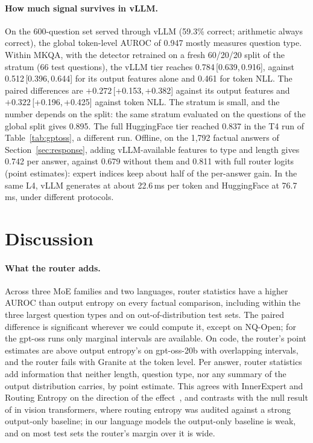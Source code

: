 \documentclass[11pt]{article}
\newcommand{\ci}[2]{\,[#1,\,#2]}
\begin{document}
\paragraph{How much signal survives in vLLM.}
On the 600-question set served through vLLM (59.3\% correct; arithmetic always correct), the global token-level AUROC of 0.947 mostly measures question type.
Within MKQA, with the detector retrained on a fresh 60/20/20 split of the stratum (66 test questions), the vLLM tier reaches 0.784\ci{0.639}{0.916}, against 0.512\ci{0.396}{0.644} for its output features alone and 0.461 for token NLL.
The paired differences are $+0.272$\ci{+0.153}{+0.382} against its output features and $+0.322$\ci{+0.196}{+0.425} against token NLL.
The stratum is small, and the number depends on the split: the same stratum evaluated on the questions of the global split gives 0.895.
The full HuggingFace tier reached 0.837 in the T4 run of Table~\ref{tab:gptoss}, a different run.
Offline, on the 1,792 factual answers of Section~\ref{sec:response}, adding vLLM-available features to type and length gives 0.742 per answer, against 0.679 without them and 0.811 with full router logits (point estimates): expert indices keep about half of the per-answer gain.
In the same L4, vLLM generates at about 22.6\,ms per token and HuggingFace at 76.7\,ms, under different protocols.

\section{Discussion}
\label{sec:discussion}

\paragraph{What the router adds.}
Across three MoE families and two languages, router statistics have a higher AUROC than output entropy on every factual comparison, including within the three largest question types and on out-of-distribution test sets.
The paired difference is significant wherever we could compute it, except on NQ-Open; for the gpt-oss runs only marginal intervals are available.
On code, the router's point estimates are above output entropy's on gpt-oss-20b with overlapping intervals, and the router fails with Granite at the token level.
Per answer, router statistics add information that neither length, question type, nor any summary of the output distribution carries, by point estimate.
This agrees with InnerExpert and Routing Entropy on the direction of the effect~\citep{fonseca2026innerexpert,li2026routing}, and contrasts with the null result of \citet{liang2026auditing} in vision transformers, where routing entropy was audited against a strong output-only baseline; in our language models the output-only baseline is weak, and on most test sets the router's margin over it is wide.
\end{document}

